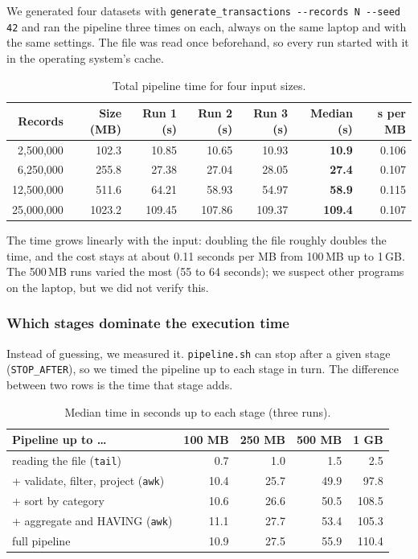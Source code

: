 \documentclass[11pt,a4paper]{article}
\newcommand{\file}[1]{\texttt{#1}}
\begin{document}
We generated four datasets with \file{generate\_transactions -{}-records N
-{}-seed 42} and ran the pipeline three times on each, always on the same laptop
and with the same settings. The file was read once beforehand, so every run
started with it in the operating system's cache.

\begin{table}[H]
\centering
\small
\begin{tabular}{@{}rrrrrrr@{}}
\toprule
Records & Size (MB) & Run 1 (s) & Run 2 (s) & Run 3 (s) & Median (s) & s per MB \\
\midrule
2{,}500{,}000  & 102.3  & 10.85  & 10.65  & 10.93  & \textbf{10.9}  & 0.106 \\
6{,}250{,}000  & 255.8  & 27.38  & 27.04  & 28.05  & \textbf{27.4}  & 0.107 \\
12{,}500{,}000 & 511.6  & 64.21  & 58.93  & 54.97  & \textbf{58.9}  & 0.115 \\
25{,}000{,}000 & 1023.2 & 109.45 & 107.86 & 109.37 & \textbf{109.4} & 0.107 \\
\bottomrule
\end{tabular}
\caption{Total pipeline time for four input sizes.}
\end{table}

The time grows linearly with the input: doubling the file roughly doubles the
time, and the cost stays at about 0.11 seconds per MB from 100\,MB up to 1\,GB.
The 500\,MB runs varied the most (55 to 64 seconds); we suspect other programs
on the laptop, but we did not verify this.

\subsubsection*{Which stages dominate the execution time}

Instead of guessing, we measured it. \file{pipeline.sh} can stop after a given
stage (\file{STOP\_AFTER}), so we timed the pipeline up to each stage in turn.
The difference between two rows is the time that stage adds.

\begin{table}[H]
\centering
\small
\begin{tabular}{@{}lrrrr@{}}
\toprule
Pipeline up to \ldots & 100 MB & 250 MB & 500 MB & 1 GB \\
\midrule
reading the file (\file{tail}) & 0.7 & 1.0 & 1.5 & 2.5 \\
+ validate, filter, project (\file{awk}) & 10.4 & 25.7 & 49.9 & 97.8 \\
+ sort by category & 10.6 & 26.6 & 50.5 & 108.5 \\
+ aggregate and HAVING (\file{awk}) & 11.1 & 27.7 & 53.4 & 105.3 \\
full pipeline & 10.9 & 27.5 & 55.9 & 110.4 \\
\bottomrule
\end{tabular}
\caption{Median time in seconds up to each stage (three runs).}
\end{table}
\end{document}
